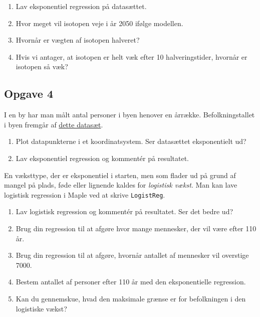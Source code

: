 \begin{enumerate}[label=\roman*)]
	\item Lav eksponentiel regression på datasættet.
	\item Hvor meget vil isotopen veje i år 2050 ifølge modellen.
	\item Hvornår er vægten af isotopen halveret?
	\item Hvis vi antager, at isotopen er helt væk efter 10 halveringstider, hvornår er isotopen så væk?
\end{enumerate}

\subsection*{Opgave 4}

I en by har man målt antal personer i byen henover en årrække. Befolkningstallet i byen fremgår af \href{https://github.com/ChristianJLex/TeachingNotes/raw/master/2023-2024/Data%20og%20lign/befolkningibylogist.xlsx}{\color{blue!60} dette datasæt}.

\begin{enumerate}[label=\roman*)]
	\item Plot datapunkterne i et koordinatsystem. Ser datasættet eksponentielt ud?
	\item Lav eksponentiel regression og kommentér på resultatet. 
\end{enumerate}
En væksttype, der er eksponentiel i starten, men som flader ud på grund af mangel på plads, føde eller lignende kaldes for \textit{logistisk vækst}. Man kan lave logistisk regression i Maple ved at skrive \texttt{LogistReg}.

\begin{enumerate}[label=\roman*)]
	\item Lav logistisk regression og kommentér på resultatet. Ser det bedre ud?
	\item Brug din regression til at afgøre hvor mange mennesker, der vil være efter 110 år.
	\item Brug din regression til at afgøre, hvornår antallet af mennesker vil overstige 7000.
	\item Bestem antallet af personer efter 110 år med den eksponentielle regression. 
	\item Kan du gennemskue, hvad den maksimale grænse er for befolkningen i den logistiske vækst?
\end{enumerate}
